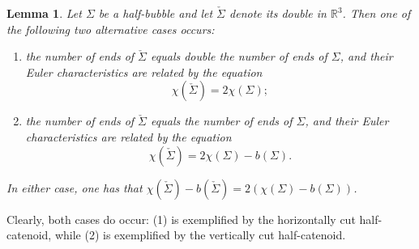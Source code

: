 \documentclass[10pt]{article}
\newtheorem{lem}[thm]{Lemma}
\theoremstyle{definition}\newtheorem{definition}[thm]{Definition}
\numberwithin{equation}{section}
\newcommand{\R}{\mathbb{R}}\newcommand{\C}{\mathbb{C}}\newcommand{\N}{\mathbb{N}}
\begin{document}
        	\begin{lem}\label{lem:euler}
        		Let $\Sigma$ be a half-bubble and let $\check{\Sigma}$ denote its double in $\R^3$. Then one of the following two alternative cases occurs:
        		\begin{enumerate}
        			\item{the number of ends of $\check{\Sigma}$ equals double the number of ends of $\Sigma$, and their Euler characteristics are related by the equation
        				\[
        				\chi(\check{\Sigma})=2\chi(\Sigma);
        				\]	
        			}
        			\item{the number of ends of $\check{\Sigma}$ equals the number of ends of $\Sigma$,  and their Euler characteristics are related by the equation
        				\[
        				\chi(\check{\Sigma})=2\chi(\Sigma)-b(\Sigma).
        				\]
        			}	
        			\end{enumerate}
        			In either case, one has that $\chi(\check{\Sigma})-b(\check{\Sigma})=2(\chi(\Sigma)-b(\Sigma))$.
        	\end{lem}	
        	
        	Clearly, both cases do occur: (1) is exemplified by the horizontally cut half-catenoid, while (2) is exemplified by the vertically cut half-catenoid. 
        	
\end{document}
